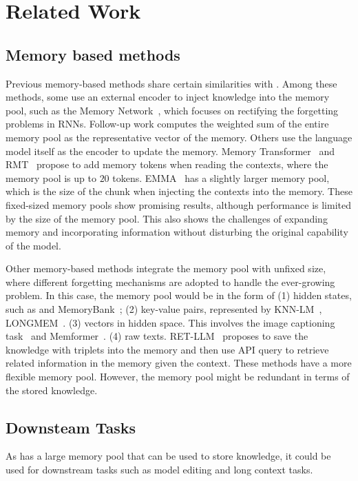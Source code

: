 \section{Related Work}
\subsection{Memory based methods}
Previous memory-based methods share certain similarities with \ours. Among these methods, some use an external encoder to inject knowledge into the memory pool, such as the Memory Network~\citep{MemoryNetwork}, which focuses on rectifying the forgetting problems in RNNs. Follow-up work \citet{E2EMN} computes the weighted sum of the entire memory pool as the representative vector of the memory. Others use the language model itself as the encoder to update the memory. Memory Transformer~\citep{memoryTransformer} and RMT~\citep{RMT} propose to add memory tokens when reading the contexts, where the memory pool is up to $20$ tokens. EMMA~\citep{Memory-Enhanced-Transformer} has a slightly larger memory pool, which is the size of the chunk when injecting the contexts into the memory. These fixed-sized memory pools show promising results, although performance is limited by the size of the memory pool. This also shows the challenges of expanding memory and incorporating information without disturbing the original capability of the model. 

Other memory-based methods integrate the memory pool with unfixed size, where different forgetting mechanisms are adopted to handle the ever-growing problem. In this case, the memory pool would be in the form of (1) hidden states, such as \citep{GlobalMemoryTransformer} and MemoryBank~\citep{MemoryBank}; (2) key-value pairs, represented by KNN-LM~\citep{kNNLM}, LONGMEM~\citep{LongMEM}. (3) vectors in hidden space. This involves the image captioning task~\citep{MeshedTforIC} and Memformer~\citep{Memformer}. (4) raw texts. RET-LLM~\citep{ret-llm} proposes to save the knowledge with triplets into the memory and then use API query to retrieve related information in the memory given the context. 
These methods have a more flexible memory pool. However, the memory pool might be redundant in terms of the stored knowledge.

\subsection{Downsteam Tasks}
As \ours has a large memory pool that can be used to store knowledge, it could be used for downstream tasks such as model editing and long context tasks. 

